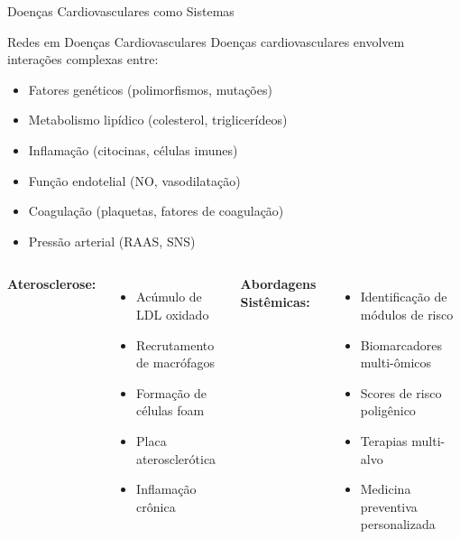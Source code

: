 \begin{frame}{Doenças Cardiovasculares como Sistemas}
\begin{block}{Redes em Doenças Cardiovasculares}
Doenças cardiovasculares envolvem interações complexas entre:
\begin{itemize}
    \item Fatores genéticos (polimorfismos, mutações)
    \item Metabolismo lipídico (colesterol, triglicerídeos)
    \item Inflamação (citocinas, células imunes)
    \item Função endotelial (NO, vasodilatação)
    \item Coagulação (plaquetas, fatores de coagulação)
    \item Pressão arterial (RAAS, SNS)
\end{itemize}
\end{block}

\vspace{0.3cm}

\begin{columns}
\textbf{Aterosclerose:}
\begin{itemize}
    \item Acúmulo de LDL oxidado
    \item Recrutamento de macrófagos
    \item Formação de células foam
    \item Placa aterosclerótica
    \item Inflamação crônica
\end{itemize}

\textbf{Abordagens Sistêmicas:}
\begin{itemize}
    \item Identificação de módulos de risco
    \item Biomarcadores multi-ômicos
    \item Scores de risco poligênico
    \item Terapias multi-alvo
    \item Medicina preventiva personalizada
\end{itemize}
\end{columns}
\end{frame}

